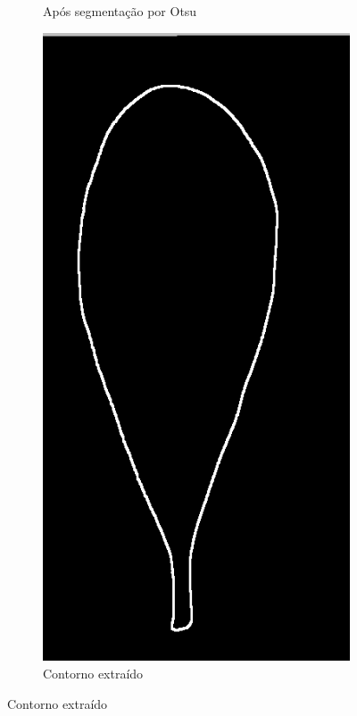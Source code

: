 \begin{figure}[htb]
\begin{subfigure}[t]{0.24\textwidth}
		\caption{Após segmentação por Otsu}
	\end{subfigure}
	\begin{subfigure}[t]{0.24\textwidth}
		\centering
		\includegraphics[width=1\textwidth]{img/contour.jpg}
		\caption{Contorno extraído}
	\end{subfigure}
	\label{img:preprocess}
\end{figure}

